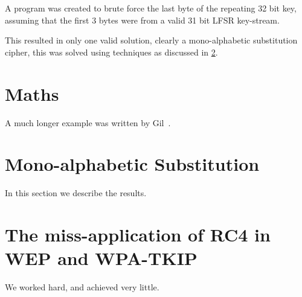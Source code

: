 \documentclass[pdftex, 12pt, a4paper]{article}
\begin{document}
A program was created to brute force the last byte of the repeating 32 bit key, assuming that the first 3 bytes were from a valid 31 bit LFSR key-stream.



This resulted in only one valid solution, clearly a mono-alphabetic substitution cipher, this was solved using techniques as discussed in \ref{mono}.

\section{Maths}\label{previous work}
A much longer \LaTeXe{} example was written by Gil~\cite{Gil:02}.

\section{Mono-alphabetic Substitution}\label{mono}
In this section we describe the results.

\section{The miss-application of RC4 in WEP and WPA-TKIP}\label{conclusions}
We worked hard, and achieved very little.



\end{document}
